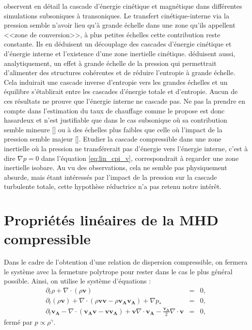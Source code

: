 \cite{aluie_conservative_2012} observent en détail la cascade d'énergie cinétique et magnétique dans différentes simulations subsoniques à transoniques. Le transfert cinétique-interne via la pression semble n'avoir lieu qu'à grande échelle dans une zone qu'ils appellent <<zone de conversion>>, à plus petites échelles cette contribution reste constante. Ils en déduisent un découplage des cascades d'énergie cinétique et d'énergie interne et l'existence d'une zone inertielle cinétique. \cite{eyink_cascades_2018} déduisent aussi, analytiquement, un effet à grande échelle de la pression qui permettrait d'alimenter des structures cohérentes et de réduire l'entropie à grande échelle. Cela induirait une cascade inverse d'entropie vers les grandes échelles et un équilibre s'établirait entre les cascades d'énergie totale et d'entropie. Aucun de ces résultats ne prouve que l'énergie interne ne cascade pas. Ne pas la prendre en compte dans l'estimation du taux de chauffage comme le propose \cite{hellinger_von_2018} est donc hasardeux et n'est justifiable que dans le cas subsonique où sa contribution semble mineure [\cite{andres_energy_2018,ferrand_compressible_2020}] ou à des échelles plus faibles que celle où l'impact de la pression semble majeur [\cite{aluie_conservative_2012}]. Etudier la cascade compressible dans une zone inertielle où la pression ne transférerait pas d'énergie vers l'énergie interne, c'est à dire $\nabla p = 0$ dans l'équation \eqref{eq:lin_cpi_v}, correspondrait à regarder une zone inertielle isobare. Au vu des observations, cela ne semble pas physiquement absurde, mais étant intéressés par l'impact de la pression sur la cascade turbulente totale, cette hypothèse réductrice n'a pas retenu notre intérêt. 


\section{Propriétés linéaires de la \ac{MHD} compressible}
\label{sec-123}

Dans le cadre de l'obtention d'une relation de dispersion compressible, on fermera le système avec la fermeture polytrope pour rester dans le cas le plus général possible. Ainsi, on utilise le système d'équations : 
\begin{eqnarray}
\label{eq:lin_cpi_r}\partial_t \rho + \nabla \cdot \left(\rho \boldsymbol{v}\right) &=& 0,\\
\label{eq:lin_cpi_v}\partial_t \left(\rho \boldsymbol{v}\right) + \nabla \cdot \left(\rho \boldsymbol{v}\boldsymbol{v} - \rho \boldsymbol{v_A}\boldsymbol{v_A}\right) +  \nabla p_*  &=& 0 \label{eq:model_1}, \\
\label{eq:lin_cpi_b}\partial_t \boldsymbol{v_A} -  \nabla \cdot \left(\boldsymbol{v_A}\boldsymbol{v} - \boldsymbol{v}\boldsymbol{v_A}\right) +  \boldsymbol{v}  \nabla \cdot \boldsymbol{v_A} -  \frac{\boldsymbol{v_A}}{2}  \nabla \cdot \boldsymbol{v} &=& 0 ,
\end{eqnarray}
fermé par $p\propto \rho^{\gamma}$. 
 
